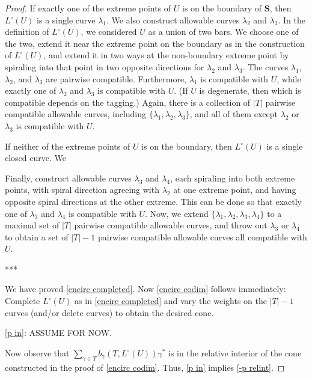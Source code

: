 \documentclass{amsart}
\theoremstyle{definition}
\theoremstyle{remark}
\numberwithin{equation}{section}
\newcommand{\set}[1]{{\lbrace #1 \rbrace}}
\newcommand{\0}{{\mathbf{0}}}
\renewcommand{\S}{\mathbf{S}}
\newcommand{\Wall}{\operatorname{Wall}}
\begin{document}
\begin{proof}
If exactly one of the extreme points of $U$ is on the boundary of $\S$, then $L^\circ(U)$ is a single curve $\lambda_1$.
We also construct allowable curves $\lambda_2$ and $\lambda_3$.
In the definition of $L^\circ(U)$, we considered $U$ as a union of two bars.
We choose one of the two, extend it near the extreme point on the boundary as in the construction of $L^\circ(U)$, and extend it in two ways at the non-boundary extreme point by spiraling into that point in two opposite directions for $\lambda_2$ and $\lambda_3$.
The curves $\lambda_1$, $\lambda_2$, and $\lambda_3$ are pairwise compatible.
Furthermore, $\lambda_1$ is compatible with $U$, while exactly one of $\lambda_2$ and $\lambda_3$ is compatible with $U$.  
(If $U$ is degenerate, then which is compatible depends on the tagging.)
Again, there is a collection of $|T|$ pairwise compatible allowable curves, including $\set{\lambda_1,\lambda_2,\lambda_3}$, and all of them except $\lambda_2$ or $\lambda_3$ is compatible with $U$.

If neither of the extreme points of $U$ is on the boundary, then $L^\circ(U)$ is a single closed curve.
We 

Finally, construct allowable curves $\lambda_3$ and $\lambda_4$, each spiraling into both extreme points, with spiral direction agreeing with $\lambda_2$ at one extreme point, and having opposite spiral directions at the other extreme.
This can be done so that exactly one of $\lambda_3$ and $\lambda_4$ is compatible with $U$.
Now, we extend $\set{\lambda_1,\lambda_2,\lambda_3,\lambda_4}$ to a maximal set of $|T|$ pairwise compatible allowable curves, and throw out $\lambda_3$ or $\lambda_4$ to obtain a set of $|T|-1$ pairwise compatible allowable curves all compatible with $U$.


***


We have proved \eqref{encirc completed}.
Now \eqref{encirc codim} follows immediately:  Complete $L^\circ(U)$ as in \eqref{encirc completed} and vary the weights on the $|T|-1$ curves (and/or delete curves) to obtain the desired cone.

\eqref{p in}:  ASSUME FOR NOW.

Now observe that $\sum_{\gamma\in T}b_\gamma(T,L^\circ(U))\gamma^*$ is in the relative interior of the cone constructed in the proof of \eqref{encirc codim}.
Thus, \eqref{p in} implies \eqref{-p relint}. %
\end{proof}
\end{document}

